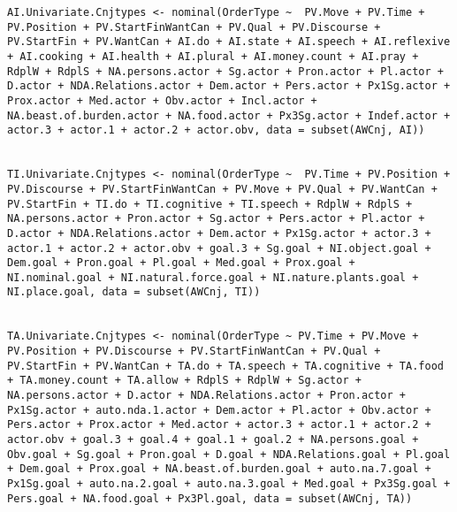 \begin{lstlisting}[style=mystyle]
AI.Univariate.Cnjtypes <- nominal(OrderType ~  PV.Move + PV.Time + PV.Position + PV.StartFinWantCan + PV.Qual + PV.Discourse + PV.StartFin + PV.WantCan + AI.do + AI.state + AI.speech + AI.reflexive + AI.cooking + AI.health + AI.plural + AI.money.count + AI.pray + RdplW + RdplS + NA.persons.actor + Sg.actor + Pron.actor + Pl.actor + D.actor + NDA.Relations.actor + Dem.actor + Pers.actor + Px1Sg.actor + Prox.actor + Med.actor + Obv.actor + Incl.actor + NA.beast.of.burden.actor + NA.food.actor + Px3Sg.actor + Indef.actor + actor.3 + actor.1 + actor.2 + actor.obv, data = subset(AWCnj, AI))


TI.Univariate.Cnjtypes <- nominal(OrderType ~  PV.Time + PV.Position + PV.Discourse + PV.StartFinWantCan + PV.Move + PV.Qual + PV.WantCan + PV.StartFin + TI.do + TI.cognitive + TI.speech + RdplW + RdplS + NA.persons.actor + Pron.actor + Sg.actor + Pers.actor + Pl.actor + D.actor + NDA.Relations.actor + Dem.actor + Px1Sg.actor + actor.3 + actor.1 + actor.2 + actor.obv + goal.3 + Sg.goal + NI.object.goal + Dem.goal + Pron.goal + Pl.goal + Med.goal + Prox.goal + NI.nominal.goal + NI.natural.force.goal + NI.nature.plants.goal + NI.place.goal, data = subset(AWCnj, TI))


TA.Univariate.Cnjtypes <- nominal(OrderType ~ PV.Time + PV.Move + PV.Position + PV.Discourse + PV.StartFinWantCan + PV.Qual + PV.StartFin + PV.WantCan + TA.do + TA.speech + TA.cognitive + TA.food + TA.money.count + TA.allow + RdplS + RdplW + Sg.actor + NA.persons.actor + D.actor + NDA.Relations.actor + Pron.actor + Px1Sg.actor + auto.nda.1.actor + Dem.actor + Pl.actor + Obv.actor + Pers.actor + Prox.actor + Med.actor + actor.3 + actor.1 + actor.2 + actor.obv + goal.3 + goal.4 + goal.1 + goal.2 + NA.persons.goal + Obv.goal + Sg.goal + Pron.goal + D.goal + NDA.Relations.goal + Pl.goal + Dem.goal + Prox.goal + NA.beast.of.burden.goal + auto.na.7.goal + Px1Sg.goal + auto.na.2.goal + auto.na.3.goal + Med.goal + Px3Sg.goal + Pers.goal + NA.food.goal + Px3Pl.goal, data = subset(AWCnj, TA))

\end{lstlisting}
